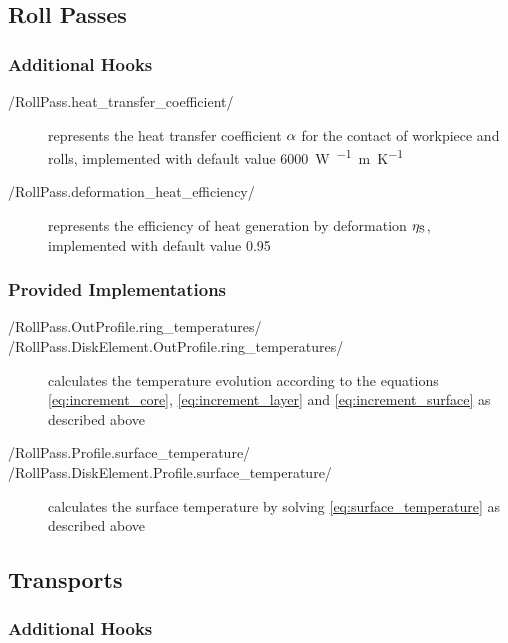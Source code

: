 \documentclass{PyRollDocs}
\begin{document}
    \subsection{Roll Passes}

    \subsubsection{Additional Hooks}

    \begin{description}
        \item[\py/RollPass.heat_transfer_coefficient/] represents the heat transfer coefficient ${\alpha}$ for the contact of workpiece and rolls, implemented with default value \qty{6000}{\watt\per\squared\meter\per\kelvin}
        \item[\py/RollPass.deformation_heat_efficiency/] represents the efficiency of heat generation by deformation ${\eta_\mathrm{S}}$, implemented with default value \num{0.95}
    \end{description}

    \subsubsection{Provided Implementations}

    \begin{description}
        \item[\py/RollPass.OutProfile.ring_temperatures/]
        \item[\py/RollPass.DiskElement.OutProfile.ring_temperatures/] calculates the temperature evolution according to the equations \autoref{eq:increment_core}, \autoref{eq:increment_layer} and \autoref{eq:increment_surface} as described above
        \item[\py/RollPass.Profile.surface_temperature/]
        \item[\py/RollPass.DiskElement.Profile.surface_temperature/] calculates the surface temperature by solving \autoref{eq:surface_temperature} as described above
    \end{description}

    \subsection{Transports}

    \subsubsection{Additional Hooks}
\end{document}
